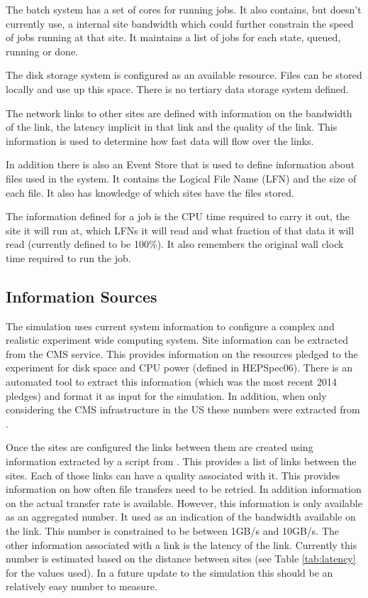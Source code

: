 \documentclass[a4paper]{jpconf}
\begin{document}
The batch system has a set of cores for running jobs. It also
contains, but doesn't currently use, a internal site bandwidth which
could further constrain the speed of jobs running at that site. It
maintains a list of jobs for each state, queued, running or done.

The disk storage system is configured as an available resource. Files
can be stored locally and use up this space. There is no tertiary data
storage system defined.

The network links to other sites are defined with information on the
bandwidth of the link, the latency implicit in that link and the quality
of the link. This information is used to determine how fast data will
flow over the links.

In addition there is also an Event Store that is used to define
information about files used in the system. It contains the Logical
File Name (LFN) and the size of each file. It also has knowledge of
which sites have the files stored.

The information defined for a job is the CPU time required to carry it
out, the site it will run at, which LFNs it will read and what
fraction of that data it will read (currently defined to be 100\%). It
also remembers the original wall clock time required to run the job.

\subsection{Information Sources}

The simulation uses current system information to configure a complex and
realistic experiment wide computing system. Site information can be
extracted from the CMS
service. This provides information on the resources pledged to the
experiment for disk space and CPU power (defined in HEPSpec06). There
is an automated tool to extract this information (which was the most
recent 2014 pledges) and format it as input for the simulation. In
addition, when only considering the CMS infrastructure in the US these
numbers were extracted from
.

Once the sites are configured the links between them are created using
information extracted by a script from
. This
provides a list of links between the sites. Each of those links can
have a quality associated with it. This provides information on how
often file transfers need to be retried. In addition information on
the actual transfer rate is available. However, this information is
only available as an aggregated number. It used as an indication of
the bandwidth available on the link. This number is constrained to be
between 1GB/s and 10GB/s. The other information associated with a link
is the latency of the link. Currently this number is estimated based
on the distance between sites (see Table \ref{tab:latency} for the
values used). In a future update to the simulation this should be an
relatively easy number to measure.
\end{document}
